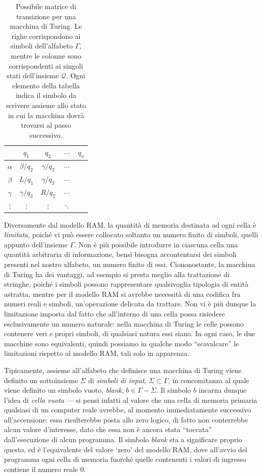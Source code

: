 \documentclass[10pt]{\classname}
\theoremstyle{definition}
\theoremstyle{definition}
\theoremstyle{definition}
\theoremstyle{definition}
\begin{document}
\begin{table}[ht]
\centering
\begin{tabular}{c|cccc}
    & $q_1$ & $q_2$ & $\cdots$ & $q_n$ \\
    \hline
$\alpha$ & $\beta/q_2$ & $\gamma/q_2$ & $\cdots$ & \\
$\beta$ & $L/q_1$ & $\gamma/q_3$ & $\cdots$ & \\
$\gamma$ & $\gamma/q_3$ & $R/q_2$ & $\cdots$ & \\
$\vdots$ & $\vdots$ & $\vdots$ & $\ddots$ &    
\end{tabular}
\caption{Possibile matrice di transizione per una macchina di Turing. Le righe
corrispondono ai simboli dell'alfabeto $\Gamma$, mentre le colonne sono
corrispondenti ai singoli stati dell'insieme $\mathcal
Q$. Ogni elemento della tabella indica il simbolo da scrivere assieme allo stato in cui la
macchina dovrà trovarsi al passo successivo.}\label{tab:matriceTransizione}
\end{table}
\bigskip


Diversamente dal modello RAM, la quantità di memoria destinata ad ogni cella è
\emph{limitata}, poiché vi può essere collocato soltanto un numero finito di
simboli, quelli appunto dell'insieme $\Gamma$. Non è più possibile introdurre in ciascuna cella una quantità arbitraria di informazione, bensì bisogna accontentarsi dei simboli presenti
nel nostro alfabeto, un numero finito di essi. Ciononostante, la macchina di
Turing ha dei vantaggi, ad esempio si presta meglio alla trattazione di
stringhe, poiché i simboli possono rappresentare qualsivoglia tipologia di
entità astratta, mentre per il modello RAM si avrebbe necessità di una codifica
fra numeri reali e simboli, un'operazione delicata da trattare. Non vi è più dunque la limitazione
imposta dal fatto che all'interno di una cella possa risiedere esclusivamente
un numero naturale: nella macchina di Turing le celle possono contenere veri e
propri simboli, di qualsiasi natura essi siano. In ogni caso, le due macchine
sono equivalenti, quindi possiamo in qualche modo ``scavalcare'' le limitazioni
rispetto al modello RAM, tali solo in apparenza.

Tipicamente, assieme all'alfabeto che definisce una macchina di Turing viene definito
un sottoinsieme $\Sigma$ di \emph{simboli di input}, $\Sigma \subset \Gamma$, in
concomitanza al quale viene definito un simbolo vuoto, \emph{blank}, $b \in
\Gamma - \Sigma$. Il simbolo $b$ incarna dunque l'idea di \emph{cella
vuota} --- si pensi infatti al valore che una cella di memoria primaria
qualsiasi di un computer reale avrebbe, al momento immediatamente successivo
all'accensione: essa risulterebbe posta allo zero logico, di fatto non
conterrebbe alcun valore d'interesse, dato che essa non è ancora stata
``toccata'' dall'esecuzione di alcun programma. Il simbolo \emph{blank} sta a
significare proprio questo, ed è l'equivalente del valore `zero' del modello
RAM, dove all'avvio del programma ogni cella di memoria fuorché quelle
contenenti i valori di ingresso contiene il numero reale $0$.
\end{document}
